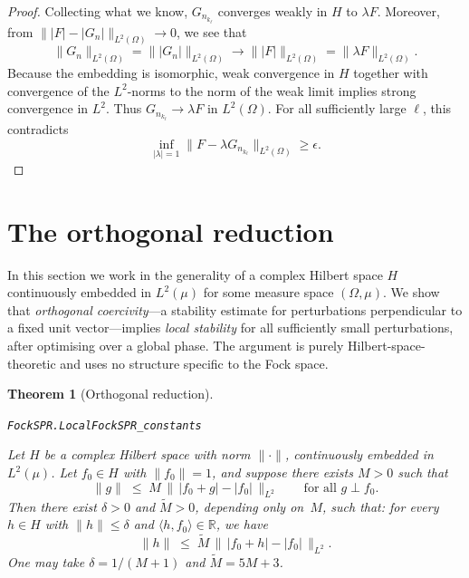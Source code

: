 \documentclass[11pt]{amsart}
\newtheorem{theorem}{Theorem}[section]
\theoremstyle{definition}
\theoremstyle{remark}
\begin{document}
\begin{proof}
Collecting what we know, \(G_{n_{k_\ell}}\) converges weakly in \(H\) to
\(\lambda F\). Moreover, from
\(\lVert \lvert F \rvert-\lvert G_n \rvert \rVert_{L^2(\Omega)}\to0\), we see that
\[
\lVert G_n \rVert_{L^2(\Omega)}=\lVert \lvert G_n \rvert \rVert_{L^2(\Omega)}
\to
\lVert \lvert F \rvert \rVert_{L^2(\Omega)}
=\lVert \lambda F \rVert_{L^2(\Omega)}.
\]
Because the embedding is isomorphic, weak convergence in \(H\) together with
convergence of the \(L^2\)-norms to the norm of the weak limit implies strong
convergence in \(L^2\). Thus \(G_{n_{k_\ell}}\to\lambda F\) in
\(L^2(\Omega)\). For all sufficiently large \(\ell\), this contradicts
\[
\inf_{\lvert \lambda \rvert=1}
\lVert F-\lambda G_{n_{k_\ell}} \rVert_{L^2(\Omega)}
\ge \epsilon.
\]
\end{proof}

\section{The orthogonal reduction}\label{sec:reduction}

In this section we work in the generality of a complex Hilbert space $H$
continuously embedded in $L^2(\mu)$ for some measure space $(\Omega, \mu)$.
We show that \emph{orthogonal coercivity}---a stability estimate for
perturbations perpendicular to a fixed unit vector---implies \emph{local
stability} for all sufficiently small perturbations, after optimising over a
global phase.  The argument is purely Hilbert-space-theoretic and uses no
structure specific to the Fock space.

\begin{theorem}[Orthogonal reduction]\label{thm:reduction}
\par\noindent\texttt{FockSPR.LocalFockSPR\_constants}\par\smallskip
Let $H$ be a complex Hilbert space with norm $\lVert \cdot \rVert$, continuously
embedded in $L^2(\mu)$.  Let $f_0 \in H$ with $\lVert f_0 \rVert = 1$, and
suppose there exists $M > 0$ such that
\begin{equation}\label{eq:orthog-hyp}
\lVert g \rVert
\;\le\;
M\, \bigl\|\, \lvert f_0 + g \rvert - \lvert f_0 \rvert \,\bigr\|_{L^2}
\qquad
\text{for all } g \perp f_0.
\end{equation}
Then there exist $\delta > 0$ and $\widetilde{M} > 0$, depending only
on~$M$, such that:
for every $h \in H$ with $\lVert h \rVert \le \delta$ and
$\langle h,f_0\rangle \in \mathbb{R}$, we have
\[
\lVert h \rVert
\;\le\;
\widetilde{M}\, \bigl\|\, \lvert f_0 + h \rvert - \lvert f_0 \rvert \,\bigr\|_{L^2}.
\]
One may take $\delta = 1/(M+1)$ and $\widetilde{M} = 5M + 3$.
\end{theorem}
\end{document}
